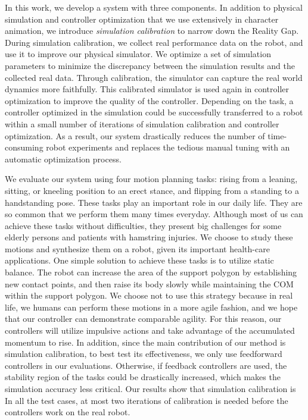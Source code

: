   In this work, we develop a system with three components. In addition to physical simulation and controller optimization that we use extensively in character animation, we introduce \emph{simulation calibration} to narrow down the Reality Gap. During simulation calibration, we collect real performance data on the robot, and use it to improve our physical simulator. We optimize a set of simulation parameters to minimize the discrepancy between the simulation results and the collected real data. Through calibration, the simulator can capture the real world dynamics more faithfully. This calibrated simulator is used again in controller optimization to improve the quality of the controller. Depending on the task, a controller optimized in the simulation could be successfully transferred to a robot within a small number of iterations of simulation calibration and controller optimization. As a result, our system drastically reduces the number of time-consuming robot experiments and replaces the tedious manual tuning with an automatic optimization process. 

We evaluate our system using four motion planning tasks: rising from a leaning, sitting, or kneeling position to an erect stance, and flipping from a standing to a handstanding pose. These tasks play an important role in our daily life. They are so common that we perform them many times everyday. Although most of us can achieve these tasks without difficulties, they present big challenges for some elderly persons and patients with hamstring injuries. We choose to study these motions and synthesize them on a robot, given its important health-care applications. One simple solution to achieve these tasks is to utilize static balance. The robot can increase the area of the support polygon by establishing new contact points, and then raise its body slowly while maintaining the COM within the support polygon. We choose not to use this strategy because in real life, we humans can perform these motions in a more agile fashion, and we hope that our controller can demonstrate comparable agility. For this reason, our controllers will utilize impulsive actions and take advantage of the accumulated momentum to rise. In addition, since the main contribution of our method is simulation calibration, to best test its effectiveness, we only use feedforward controllers in our evaluations. Otherwise, if feedback controllers are used, the stability region of the tasks could be drastically increased, which makes the simulation accuracy less critical. Our results show that simulation calibration is   In all the test cases, at most two iterations of calibration is needed before the controllers work on the real robot.

